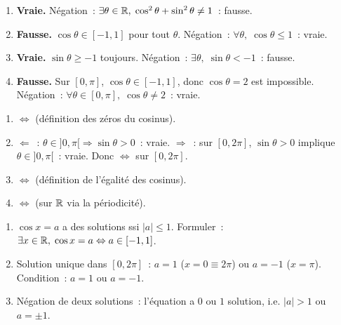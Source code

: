 
\begin{enumerate}
  \item \textbf{Vraie.} N\'egation~: $\exists\theta\in\mathbb{R},\;\cos^2\theta+\sin^2\theta\ne1$~: fausse.
  \item \textbf{Fausse.} $\cos\theta\in[-1,1]$ pour tout $\theta$. N\'egation~:
        $\forall\theta,\;\cos\theta\leq1$~: vraie.
  \item \textbf{Vraie.} $\sin\theta\geq-1$ toujours. N\'egation~: $\exists\theta,\;\sin\theta<-1$~: fausse.
  \item \textbf{Fausse.} Sur $[0,\pi]$, $\cos\theta\in[-1,1]$, donc $\cos\theta=2$ est impossible.
        N\'egation~: $\forall\theta\in[0,\pi],\;\cos\theta\ne2$~: vraie.
\end{enumerate}


\begin{enumerate}
  \item $\Leftrightarrow$ (d\'efinition des z\'eros du cosinus).
  \item $\Leftarrow$~: $\theta\in]0,\pi[\Rightarrow\sin\theta>0$~: vraie.
        $\Rightarrow$~: sur $[0,2\pi]$, $\sin\theta>0$ implique $\theta\in]0,\pi[$~: vraie.
        Donc $\Leftrightarrow$ sur $[0,2\pi]$.
  \item $\Leftrightarrow$ (d\'efinition de l'\'egalit\'e des cosinus).
  \item $\Leftrightarrow$ (sur $\mathbb{R}$ via la p\'eriodicit\'e).
\end{enumerate}


\begin{enumerate}
  \item $\cos x=a$ a des solutions ssi $|a|\leq1$.
        Formuler~: $\exists x\in\mathbb{R},\;\cos x=a\Leftrightarrow a\in[-1,1]$.
  \item Solution unique dans $[0,2\pi]$~: $a=1$ ($x=0\equiv2\pi$) ou $a=-1$ ($x=\pi$).
        Condition~: $a=1$ ou $a=-1$.
  \item N\'egation de \og deux solutions\fg~:
        l'\'equation a $0$ ou $1$ solution, i.e. $|a|>1$ ou $a=\pm1$.
\end{enumerate}

